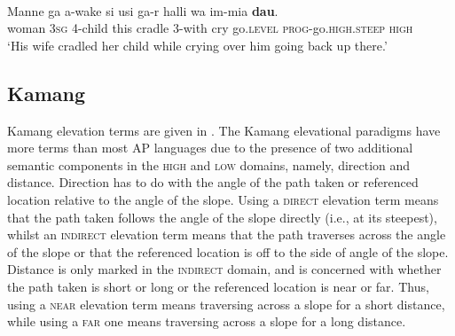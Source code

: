 \ea%
\label{ex:7:37}
 \\
\gll Manne   ga{\ng}  a-wake  si{\ng}  usi{\ng}  ga-r  halli  wa  im-mia  \textbf{dau}. \\
   woman  \textsc{3sg} 4-child  this    cradle  3-with  cry  go.\textsc{level}   \textsc{prog}{}-go.\textsc{high.steep} \textsc {high   } \\
\glt  `His wife cradled her child while crying over him going back up there.'
\z


 

\subsection{Kamang}
Kamang elevation terms are given in . The Kamang elevational paradigms have more terms than most AP languages due to the presence of two additional semantic components in the \textsc{high} and \textsc{low} domains, namely, direction and distance. Direction has to do with the angle of the path taken or referenced location relative to the angle of the slope. Using a \textsc{direct} elevation term means that the path taken follows the angle of the slope directly (i.e., at its steepest), whilst an \textsc{indirect} elevation term means that the path traverses across the angle of the slope or that the referenced location is off to the side of angle of the slope. Distance is only marked in the \textsc{indirect} domain, and is concerned with whether the path taken is short or long or the referenced location is near or far. Thus, using a \textsc{near} elevation term means traversing across a slope for a short distance, while using a \textsc{far} one means traversing across a slope for a long distance.

 

